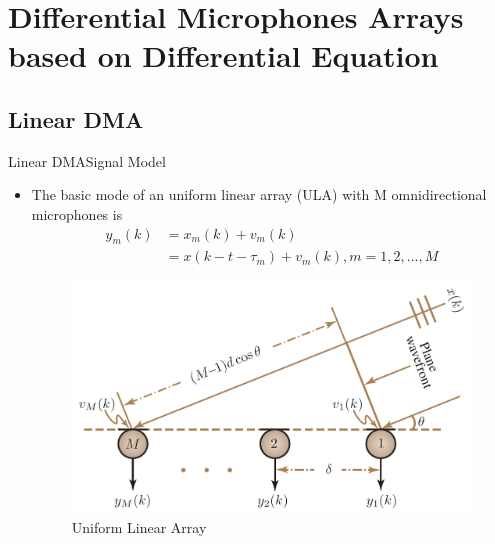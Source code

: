 \documentclass{beamer}
\begin{document}
%
%
%
%			
%

\section{Differential Microphones Arrays based on Differential Equation}

\subsection{Linear DMA}

\begin{frame}{Linear DMA}{Signal Model}
\begin{itemize}
\item The basic mode of an uniform linear array (ULA) with M omnidirectional microphones is
\begin{equation}
  \begin{align}
\label{eq:signal mode}
   {{y}_{m}}(k)&={{x}_{m}}(k)+{{v}_{m}}(k) \\ 
 & ={x}(k-t-{{\tau }_{m}})+{{v}_{m}}(k),m=1,2,...,M  
\end{align}
\end{equation}
\begin{figure}[ht]
		\includegraphics[scale=0.34]{DMA.3.png}
		\caption{Uniform Linear Array} 
		\label{LDMA}	
	\end{figure}
\end{itemize}	
\end{frame}
\end{document}
